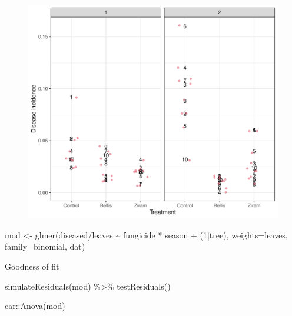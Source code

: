 \documentclass[
  letterpaper,
  DIV=11,
  numbers=noendperiod]{scrartcl}
\newenvironment{Shaded}{\begin{snugshade}}{\end{snugshade}}
\newcommand{\AttributeTok}[1]{\textcolor[rgb]{0.40,0.45,0.13}{#1}}
\newcommand{\DecValTok}[1]{\textcolor[rgb]{0.68,0.00,0.00}{#1}}
\newcommand{\FunctionTok}[1]{\textcolor[rgb]{0.28,0.35,0.67}{#1}}
\newcommand{\NormalTok}[1]{\textcolor[rgb]{0.00,0.23,0.31}{#1}}
\newcommand{\OtherTok}[1]{\textcolor[rgb]{0.00,0.23,0.31}{#1}}
\newcommand{\SpecialCharTok}[1]{\textcolor[rgb]{0.37,0.37,0.37}{#1}}
\begin{document}
\begin{figure}[H]

{\centering \includegraphics{in_field_files/figure-pdf/unnamed-chunk-4-1.pdf}

}

\end{figure}

\begin{Shaded}
\begin{Highlighting}[]
\NormalTok{mod }\OtherTok{\textless{}{-}} \FunctionTok{glmer}\NormalTok{(diseased}\SpecialCharTok{/}\NormalTok{leaves }\SpecialCharTok{\textasciitilde{}}\NormalTok{ fungicide }\SpecialCharTok{*}\NormalTok{ season }\SpecialCharTok{+}\NormalTok{ (}\DecValTok{1}\SpecialCharTok{|}\NormalTok{tree),}
             \AttributeTok{weights=}\NormalTok{leaves, }\AttributeTok{family=}\NormalTok{binomial, dat)}
\end{Highlighting}
\end{Shaded}

Goodness of fit

\begin{Shaded}
\begin{Highlighting}[]
\FunctionTok{simulateResiduals}\NormalTok{(mod) }\SpecialCharTok{\%\textgreater{}\%} \FunctionTok{testResiduals}\NormalTok{()}
\end{Highlighting}
\end{Shaded}

\begin{Shaded}
\begin{Highlighting}[]
\NormalTok{car}\SpecialCharTok{::}\FunctionTok{Anova}\NormalTok{(mod)}
\end{Highlighting}
\end{Shaded}
\end{document}
